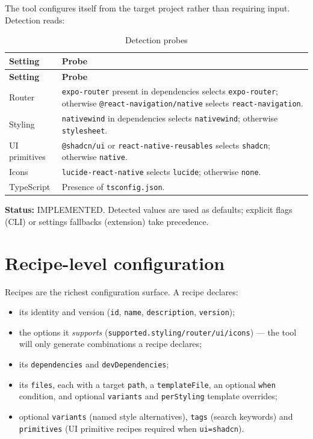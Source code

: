 The tool configures itself from the target project rather than requiring input.
Detection reads:

\begin{longtable}{@{}L{4.6cm}L{9.6cm}@{}}
\caption{Detection probes}\\
\toprule
\textbf{Setting} & \textbf{Probe} \\
\midrule
\endfirsthead
\toprule
\textbf{Setting} & \textbf{Probe} \\
\midrule
\endhead
Router & \texttt{expo-router} present in dependencies selects
\texttt{expo-router}; otherwise \texttt{@react-navigation/native} selects
\texttt{react-navigation}. \\
Styling & \texttt{nativewind} in dependencies selects \texttt{nativewind};
otherwise \texttt{stylesheet}. \\
UI primitives & \texttt{@shadcn/ui} or \texttt{react-native-reusables} selects
\texttt{shadcn}; otherwise \texttt{native}. \\
Icons & \texttt{lucide-react-native} selects \texttt{lucide}; otherwise
\texttt{none}. \\
TypeScript & Presence of \texttt{tsconfig.json}. \\
\bottomrule
\end{longtable}

\textbf{Status:} IMPLEMENTED. Detected values are used as defaults; explicit
flags (CLI) or settings fallbacks (extension) take precedence.

\section{Recipe-level configuration}

Recipes are the richest configuration surface. A recipe declares:

\begin{itemize}
  \item its identity and version (\texttt{id}, \texttt{name}, \texttt{description},
        \texttt{version});
  \item the options it \emph{supports} (\texttt{supported.styling/router/ui/icons})
        --- the tool will only generate combinations a recipe declares;
  \item its \texttt{dependencies} and \texttt{devDependencies};
  \item its \texttt{files}, each with a target \texttt{path}, a
        \texttt{templateFile}, an optional \texttt{when} condition, and optional
        \texttt{variants} and \texttt{perStyling} template overrides;
  \item optional \texttt{variants} (named style alternatives),
        \texttt{tags} (search keywords) and \texttt{primitives} (UI primitive
        recipes required when \texttt{ui=shadcn}).
\end{itemize}

